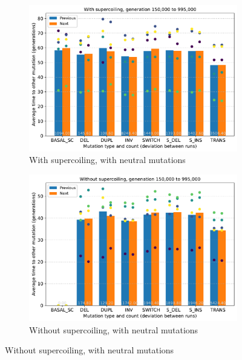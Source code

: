 \begin{figure}[h!]
  \begin{subfigure}[t]{0.49\textwidth}
    \includegraphics[width=\textwidth]{aevol/images/with_sc_mut_time_150k_995k.pdf}
    \caption{With supercoiling, with neutral mutations}
    \label{subfig:sc_neut}
  \end{subfigure}
  \begin{subfigure}[t]{0.5\textwidth}
    \includegraphics[width=\textwidth]{aevol/images/without_sc_mut_time_150k_995k.pdf}
    \caption{Without supercoiling, with neutral mutations}
    \label{subfig:no_sc_neut}
  \end{subfigure}


\end{figure}
